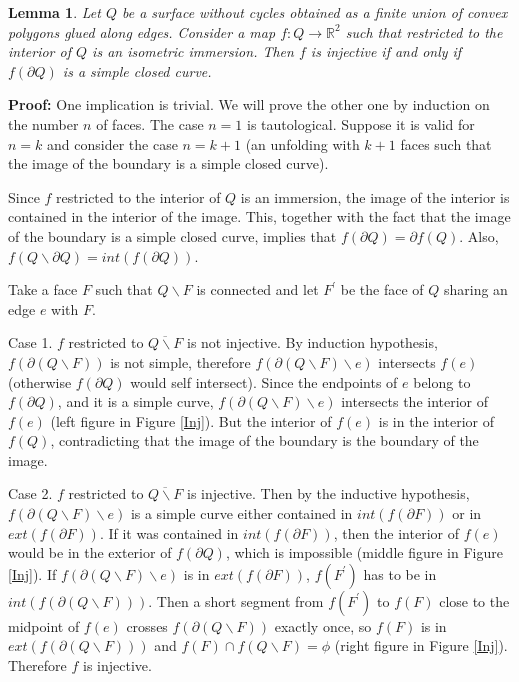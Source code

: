 \documentclass[openright, 12pt]{article}
\newtheorem{lema}[teorema]{Lemma}
\begin{document}
\begin{lema}\label{Final}
{\rm Let $Q$ be a surface without cycles obtained as a finite union of convex polygons glued along edges. Consider a map $f: Q \rightarrow \mathbb{R}^2$ such that restricted to the interior of $Q$ is an isometric immersion. Then $f$ is injective if and only if $f(\partial Q)$ is a simple closed curve. 
}
\end{lema}

\textbf{Proof: }One implication is trivial. We will prove the other one by induction on the number $n$ of faces. The case $n=1$ is tautological. Suppose it is valid for $n=k$ and consider the case $n=k+1$ (an unfolding with $k+1$ faces such that the image of the boundary is a simple closed curve). 

Since $f $ restricted to the interior of $Q$ is an immersion, the image of the interior is contained in the interior of the image. This, together with the fact that the image of the boundary is a simple closed curve, implies that $f(\partial Q)  = \partial f(Q)$. Also, $f(Q \backslash \partial Q) = int (f(\partial Q) )$.


Take a face $F$ such that $Q \backslash F$ is connected and let $F^{\prime}$ be the face of $Q$ sharing an edge $e$ with $F$.

Case 1. $f$ restricted to $\overline{ Q\backslash F}$ is not injective. By induction hypothesis, $f(\partial (Q \backslash F))$ is not simple, therefore $f(\partial (Q \backslash F ) \backslash e) $ intersects $f(e)$ (otherwise $f(\partial Q)$ would self intersect). Since the endpoints of $e$ belong to $f(\partial Q)$, and it is a simple curve, $f(\partial (Q\backslash F) \backslash e)$ intersects the interior of $f(e)$ (left figure in Figure \ref{Inj}). But the interior of $f(e)$ is in the interior of $f(Q)$, contradicting that the image of the boundary is the boundary of the image.


Case 2. $f$ restricted to $\overline{ Q \backslash F }$ is injective. Then by the inductive hypothesis, $f(\partial (Q \backslash F) \backslash e)$ is a simple curve either contained in $int(f( \partial F)) $ or in $ext( f (\partial F))$. If it was contained in $int(f( \partial F)) $, then the interior of $f(e)$ would be in the exterior of $f(\partial Q)$, which is impossible (middle figure in Figure \ref{Inj}). If $f(\partial (Q \backslash F) \backslash e)$ is in $ext( f (\partial F))$, $f(F^{\prime})$ has to be in $int (f(\partial (Q \backslash F)))$. Then a short segment from $f(F^{\prime})$ to $f(F)$ close to the midpoint of $f(e)$ crosses $f(\partial (Q \backslash F))$ exactly once, so $f(F)$ is in $ext (f(\partial (Q \backslash F)))$ and $f(F) \cap f(Q \backslash F) = \phi$ (right figure in Figure \ref{Inj}). Therefore $f$ is injective.
\end{document}
